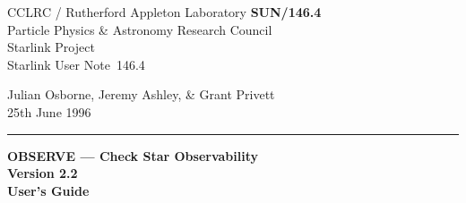 \documentclass[11pt]{article}
\newcommand{\stardoccategory}  {Starlink User Note}
\newcommand{\stardocinitials}  {SUN}
\newcommand{\stardocnumber}    {146.4}
\newcommand{\stardocauthors}   {Julian Osborne, Jeremy Ashley, \& Grant Privett}
\newcommand{\stardocdate}      {25th June 1996}
\newcommand{\stardoctitle}     {OBSERVE --- Check Star Observability}
\newcommand{\stardocversion}   {Version 2.2}
\newcommand{\stardocmanual}    {User's Guide}
\newcommand{\stardocname}{\stardocinitials /\stardocnumber}
\newenvironment{latexonly}{}{}
\begin{document}
\thispagestyle{empty}

\begin{latexonly}
   CCLRC / {\sc Rutherford Appleton Laboratory} \hfill {\bf \stardocname}\\
   {\large Particle Physics \& Astronomy Research Council}\\
   {\large Starlink Project\\}
   {\large \stardoccategory\ \stardocnumber}
   \begin{flushright}
   \stardocauthors\\
   \stardocdate
   \end{flushright}
   \vspace{-4mm}
   \rule{\textwidth}{0.5mm}
   \vspace{5mm}
   \begin{center}
   {\Huge\bf  \stardoctitle \\ [2.5ex]}
   {\LARGE\bf \stardocversion \\ [4ex]}
   {\Huge\bf  \stardocmanual}
   \end{center}
   \vspace{5mm}

\end{latexonly}
\end{document}
